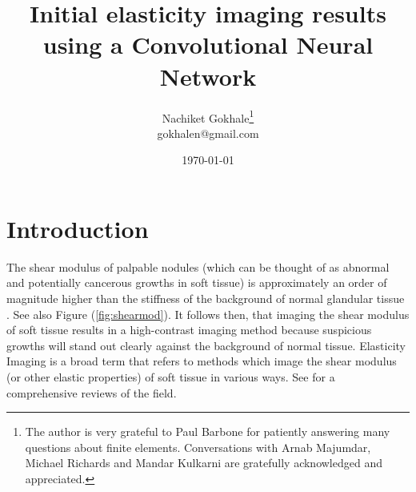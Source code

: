 \documentclass[12pt]{article}
\begin{document}
\title{Initial elasticity imaging results using a Convolutional Neural Network}
\author{Nachiket Gokhale\footnote{The author is very grateful to Paul Barbone for patiently answering many questions about finite elements. Conversations with Arnab Majumdar, Michael Richards and Mandar Kulkarni are gratefully acknowledged and appreciated.}\\gokhalen@gmail.com}
\date{\today}
\maketitle
{}
\section{Introduction}
The shear modulus of palpable nodules (which can be thought of as abnormal and potentially cancerous growths in soft tissue) is approximately an order of magnitude higher than the stiffness of the background of normal glandular tissue \cite{paper:sarv1998}. See also Figure (\ref{fig:shearmod}). It follows then, that imaging the shear modulus of soft tissue results in a high-contrast imaging method because suspicious growths will stand out clearly against the background of normal tissue. Elasticity Imaging is a broad term that refers to methods which image the shear modulus (or other elastic properties) of soft tissue in various ways. See \cite{paper:gao1996,paper:parker2010,book:alamgarra2019} for a comprehensive reviews of the field.
\end{document}
